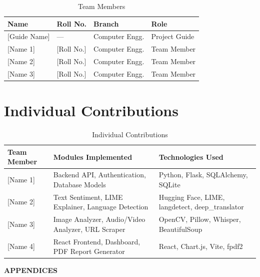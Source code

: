 \documentclass[12pt, a4paper]{report}
\begin{document}
\begin{table}[H]
\centering
\caption{Team Members}
\label{tab:members}
\small
\begin{tabularx}{\textwidth}{|X|X|X|X|}
\hline
\textbf{Name} & \textbf{Roll No.} & \textbf{Branch} & \textbf{Role} \\
\hline
{[Guide Name]} & --- & Computer Engg. & Project Guide \\
\hline
{[Name 1]} & {[Roll No.]} & Computer Engg. & Team Member \\
\hline
{[Name 2]} & {[Roll No.]} & Computer Engg. & Team Member \\
\hline
{[Name 3]} & {[Roll No.]} & Computer Engg. & Team Member \\
\hline
\end{tabularx}
\end{table}

\section{Individual Contributions}

\begin{table}[H]
\centering
\caption{Individual Contributions}
\label{tab:contributions}
\small
\begin{tabularx}{\textwidth}{|l|X|X|}
\hline
\textbf{Team Member} & \textbf{Modules Implemented} & \textbf{Technologies Used} \\
\hline
{[Name 1]} & Backend API, Authentication, Database Models & Python, Flask, SQLAlchemy, SQLite \\
\hline
{[Name 2]} & Text Sentiment, LIME Explainer, Language Detection & Hugging Face, LIME, langdetect, deep\_translator \\
\hline
{[Name 3]} & Image Analyzer, Audio/Video Analyzer, URL Scraper & OpenCV, Pillow, Whisper, BeautifulSoup \\
\hline
{[Name 4]} & React Frontend, Dashboard, PDF Report Generator & React, Chart.js, Vite, fpdf2 \\
\hline
\end{tabularx}
\end{table}

\cleardoublepage
\thispagestyle{empty}
\vspace*{\fill}
\begin{center}
    {\fontsize{32}{40}\selectfont \textbf{APPENDICES}}
\end{center}
\vspace*{\fill}
\clearpage
\end{document}
